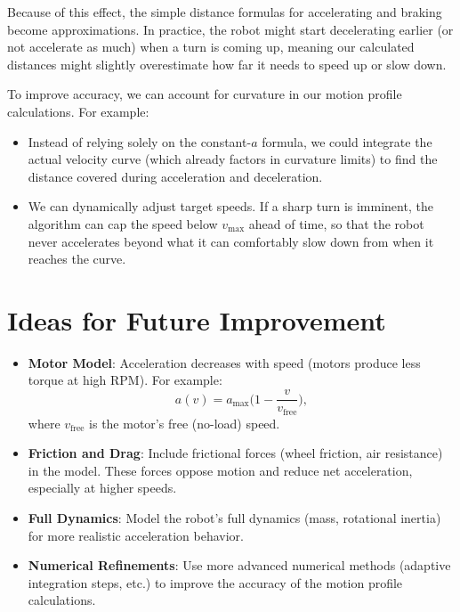\documentclass[11pt]{article}
\begin{document}

Because of this effect, the simple distance formulas for accelerating and braking become approximations. In practice, the robot might start decelerating earlier (or not accelerate as much) when a turn is coming up, meaning our calculated distances might slightly overestimate how far it needs to speed up or slow down.

To improve accuracy, we can account for curvature in our motion profile calculations. For example:
\begin{itemize}
  \item Instead of relying solely on the constant-$a$ formula, we could integrate the actual velocity curve (which already factors in curvature limits) to find the distance covered during acceleration and deceleration.
  \item We can dynamically adjust target speeds. If a sharp turn is imminent, the algorithm can cap the speed below $v_{\max}$ ahead of time, so that the robot never accelerates beyond what it can comfortably slow down from when it reaches the curve.
\end{itemize}

\section{Ideas for Future Improvement}

\begin{itemize}
  \item \textbf{Motor Model}: Acceleration decreases with speed (motors produce less torque at high RPM). For example:
  \[
    a(v) = a_{\text{max}}\Big(1 - \frac{v}{v_{\text{free}}}\Big),
  \]
  where $v_{\text{free}}$ is the motor’s free (no-load) speed.
  \item \textbf{Friction and Drag}: Include frictional forces (wheel friction, air resistance) in the model. These forces oppose motion and reduce net acceleration, especially at higher speeds.
  \item \textbf{Full Dynamics}: Model the robot’s full dynamics (mass, rotational inertia) for more realistic acceleration behavior.
  \item \textbf{Numerical Refinements}: Use more advanced numerical methods (adaptive integration steps, etc.) to improve the accuracy of the motion profile calculations.
\end{itemize}
\end{document}
